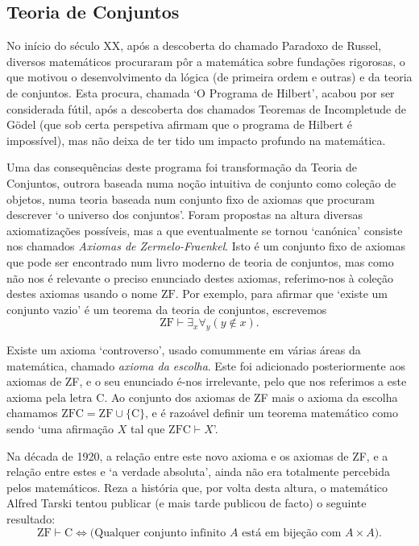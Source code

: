 \subsection*{Teoria de Conjuntos}

No início do século XX, após a descoberta do chamado Paradoxo de Russel, diversos matemáticos procuraram pôr a matemática sobre fundações rigorosas, o que motivou o desenvolvimento da lógica (de primeira ordem e outras) e da teoria de conjuntos. Esta procura, chamada `O Programa de Hilbert', acabou por ser considerada fútil, após a descoberta dos chamados Teoremas de Incompletude de Gödel (que sob certa perspetiva afirmam que o programa de Hilbert é impossível), mas não deixa de ter tido um impacto profundo na matemática.

Uma das consequências deste programa foi transformação da Teoria de Conjuntos, outrora baseada numa noção intuitiva de conjunto como coleção de objetos, numa teoria baseada num conjunto fixo de axiomas que procuram descrever `o universo dos conjuntos'. Foram propostas na altura diversas axiomatizações possíveis, mas a que eventualmente se tornou `canónica' consiste nos chamados \emph{Axiomas de Zermelo-Fraenkel}. Isto é um conjunto fixo de axiomas que pode ser encontrado num livro moderno de teoria de conjuntos, mas como não nos é relevante o preciso enunciado destes axiomas, referimo-nos à coleção destes axiomas usando o nome $\mathrm{ZF}$. Por exemplo, para afirmar que `existe um conjunto vazio' é um teorema da teoria de conjuntos, escrevemos
\begin{equation}
\mathrm{ZF} \vdash \exists_x \forall_y (y \notin x).
\end{equation}

Existe um axioma `controverso', usado comummente em várias áreas da matemática, chamado \emph{axioma da escolha}. Este foi adicionado posteriormente aos axiomas de ZF, e o seu enunciado é-nos irrelevante, pelo que nos referimos a este axioma pela letra $\mathrm{C}$. Ao conjunto dos axiomas de ZF mais o axioma da escolha chamamos $\mathrm{ZFC} = \mathrm{ZF} \cup \{\mathrm{C}\}$, e é razoável definir um teorema matemático como sendo `uma afirmação $X$ tal que $\mathrm{ZFC} \vdash X$'.

Na década de 1920, a relação entre este novo axioma e os axiomas de ZF, e a relação entre estes e `a verdade absoluta', ainda não era totalmente percebida pelos matemáticos. Reza a história que, por volta desta altura, o matemático Alfred Tarski tentou publicar (e mais tarde publicou de facto) o seguinte resultado:
\begin{equation}\label{eq:tarskithm}
\mathrm{ZF} \vdash \mathrm{C} \Leftrightarrow \big( \text{Qualquer conjunto infinito $A$ está em bijeção com $A \times A$} \big).
\end{equation}

